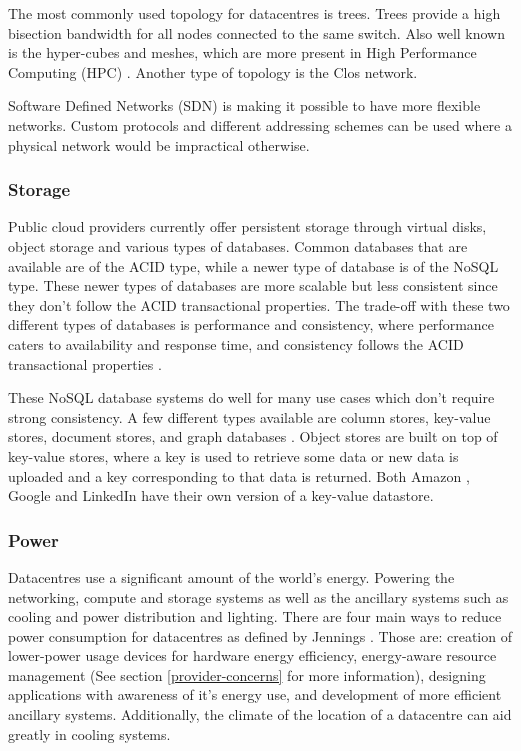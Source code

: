 \documentclass[fullapage,12pt]{article}
\begin{document}
The most commonly used topology for datacentres is trees. Trees provide a high bisection bandwidth for all nodes connected to the same switch. Also well known is the hyper-cubes and meshes, which are more present in High Performance Computing (HPC) \cite{Jennings2015}. Another type of topology is the Clos network. %

Software Defined Networks (SDN) is making it possible to have more flexible networks. Custom protocols and different addressing schemes can be used where a physical network would be impractical otherwise.

\subsubsection{Storage}


Public cloud providers currently offer persistent storage through virtual disks, object storage and various types of databases. Common databases that are available are of the ACID type, while a newer type of database is of the NoSQL type. These newer types of databases are more scalable but less consistent since they don't follow the ACID transactional properties. The trade-off with these two different types of databases is performance and consistency, where performance caters to availability and response time, and consistency follows the ACID transactional properties \cite{Jennings2015}.

These NoSQL database systems do well for many use cases which don't require strong consistency. A few different types available are column stores, key-value stores, document stores, and graph databases \cite{graphDB2013}. Object stores are built on top of key-value stores, where a key is used to retrieve some data or new data is uploaded and a key corresponding to that data is returned. Both Amazon \cite{dynamodb}, Google \cite{cassandra} and LinkedIn \cite{voldemort} have their own version of a key-value datastore.


\subsubsection{Power}

Datacentres use a significant amount of the world's energy. Powering the networking, compute and storage systems as well as the ancillary systems such as cooling and power distribution and lighting.
There are four main ways to reduce power consumption for datacentres as defined by Jennings \cite{Jennings2015}. Those are: creation of lower-power usage devices for hardware energy efficiency, energy-aware resource management (See section \ref{provider-concerns} for more information), designing applications with awareness of it's energy use, and development of more efficient ancillary systems. Additionally, the climate of the location of a datacentre can aid greatly in cooling systems.
\end{document}
